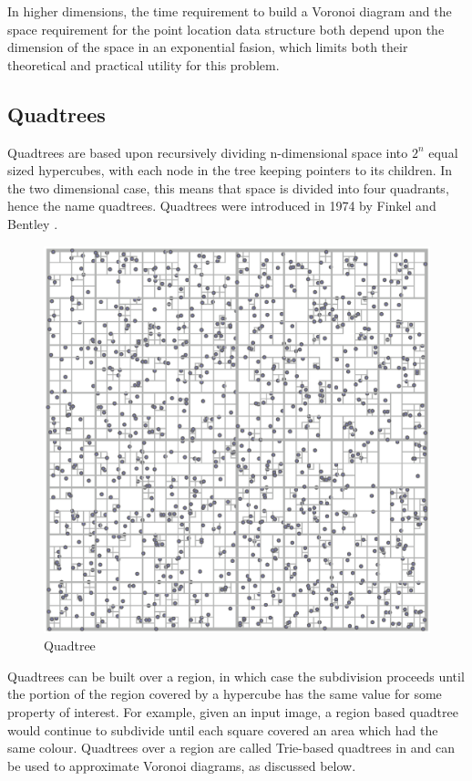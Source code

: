 \documentclass[mcs]{scsthesis}
\begin{document}
In higher dimensions, the time requirement to build a Voronoi diagram and the
space requirement for the point location data structure both depend upon the
dimension of the space in an exponential fasion, which limits both their
theoretical and practical utility for this problem.

\subsection{Quadtrees}

Quadtrees are based upon recursively dividing n-dimensional space into \(2^n\)
equal sized hypercubes, with each node in the tree keeping pointers to its
children.  In the two dimensional case, this means that space is divided into
four quadrants, hence the name quadtrees. Quadtrees were introduced in 1974 by
Finkel and Bentley \cite{quadtree}. 

\begin{figure}
\begin{center}
\includegraphics[scale=0.35]{diagrams/quadtree.eps}
\caption{Quadtree}
\label{fig:quadtree}
\end{center}
\end{figure}

Quadtrees can be built over a region, in which case the subdivision proceeds
until the portion of the region covered by a hypercube has the same value for
some property of interest. For example, given an input image, a region based
quadtree would continue to subdivide until each square covered an area which
had the same colour. Quadtrees over a region are called Trie-based quadtrees in
\cite{samet} and can be used to approximate Voronoi diagrams, as discussed
below.
\end{document}
